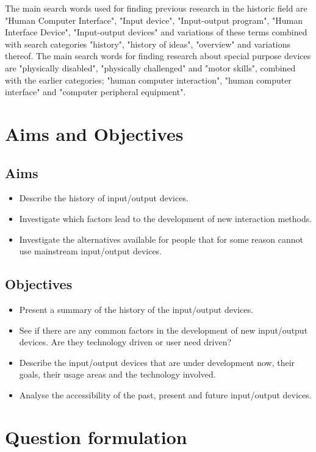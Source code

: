 \documentclass[a4paper,10pt]{article}
\begin{document}
The main search words used for finding previous research in the historic field are "Human Computer Interface", "Input device", "Input-output program", "Human Interface Device", "Input-output devices" and variations of these terms combined with search categories "history", "history of ideas", "overview" and variations thereof. The main search words for finding research about special purpose devices are "physically disabled", "physically challenged" and "motor skills", combined with the earlier categories; "human computer interaction", "human computer interface" and "computer peripheral equipment".

\section{Aims and Objectives}
\subsection{Aims}
\begin{itemize}
\item
Describe the history of input/output devices.
\item
Investigate which factors lead to the development of new interaction methods.
\item
Investigate the alternatives available for people that for some reason cannot use mainstream input/output devices.

\end{itemize}
\subsection{Objectives}
\begin{itemize}
	\item Present a summary of the history of the input/output devices.
	\item See if there are any common factors in the development of new input/output devices. Are they technology driven or user need driven?
	\item Describe the input/output devices that are under development now, their goals, their usage areas and the technology involved.
	\item Analyse the accessibility of the past, present and future input/output devices.
\end{itemize}


\section{Question formulation}	
\end{document}
